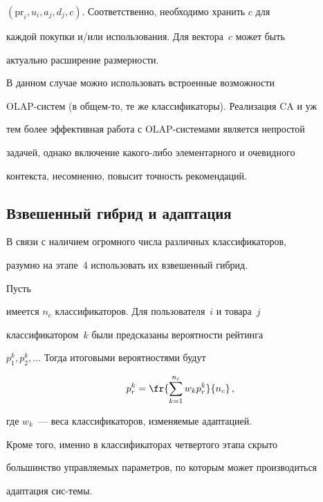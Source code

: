$(\mathrm{pr}_i,u_i,a_j,d_j,c).$ Соответственно, необходимо хранить $c$ для


каждой покупки и/или использования. Для вектора~$c$ может быть


актуально расширение размерности.





В данном случае можно использовать встроенные возможности


OLAP-сис\-тем (в об\-щем-то, те же классификаторы). Реализация CA и уж


тем более эффективная работа с  OLAP-сис\-те\-ма\-ми является непростой


задачей, однако включение какого-либо элементарного и очевидного


контекста, несомненно, повысит точность рекомендаций.





\subsection{Взвешенный гибрид и адаптация}





В связи с наличием огромного числа различных классификаторов,


разумно на этапе~4 использовать их взвешенный гибрид. 





Пусть


имеется $n_c$ классификаторов. Для пользователя~$i$ и товара~$j$


классификатором~$k$ были предсказаны вероятности рейтинга


$p_1^k,p_2^k,\ldots$ Тогда итоговыми вероятностями будут


$$


p_r^k=\fr{\sum\limits_{k=1}^{n_c}w_k  p_r^k}{n_c}\,,


$$ 


где $w_k$~--- веса классификаторов, изменяемые адаптацией.





Кроме того, именно в классификаторах четвертого этапа скрыто


большинство управ\-ля\-емых параметров, по которым может производиться


адаптация сис-\linebreak темы.





